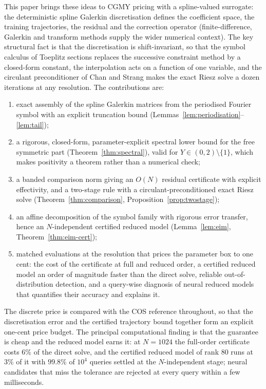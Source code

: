 \documentclass[hidelinks]{siamart251216}
\begin{document}
This paper brings these ideas to CGMY pricing with a spline-valued surrogate: the deterministic
spline Galerkin discretisation \cite{DamircheliCGMY2026} defines the coefficient space, the training
trajectories, the residual and the correction operator (finite-difference, Galerkin and transform
methods \cite{ContVoltchkova2005,MatacheVonPetersdorffSchwab2004,HilberReichmannSchwabWinter2013,FangOosterlee2008}
supply the wider numerical context).  The key structural fact is that the discretisation is
shift-invariant, so that the symbol calculus of Toeplitz sections
\cite{GrenanderSzego1958,BottcherSilbermann1999} replaces the successive constraint method by a
closed-form constant, the interpolation acts on a function of one variable, and the circulant
preconditioner of Chan and Strang \cite{ChanStrang1989} makes the exact Riesz solve a dozen
iterations at any resolution.  The contributions are:
\begin{enumerate}[leftmargin=2em]
\item exact assembly of the spline Galerkin matrices from the periodised
Fourier symbol with an explicit truncation bound (Lemmas~\ref{lem:periodisation}--\ref{lem:tail});
\item a rigorous, closed-form, parameter-explicit spectral lower bound for the free symmetric part
(Theorem~\ref{thm:spectral}), valid for $Y\in(0,2)\setminus\{1\}$, which makes positivity a
theorem rather than a numerical check;
\item a banded comparison norm giving an $O(N)$ residual certificate with explicit effectivity,
and a two-stage rule with a circulant-preconditioned exact Riesz solve
(Theorem~\ref{thm:comparison}, Proposition~\ref{prop:twostage});
\item an affine decomposition of the symbol family with rigorous error transfer, hence an
$N$-independent certified reduced model (Lemma~\ref{lem:eim}, Theorem~\ref{thm:eim-cert});
\item matched evaluations at the resolution that prices the parameter box to one cent: the cost
of the certificate at full and reduced order, a certified reduced model an order of magnitude
faster than the direct solve, reliable out-of-distribution detection, and a query-wise diagnosis
of neural reduced models that quantifies their accuracy and explains it.
\end{enumerate}
The discrete price is compared with the COS reference \cite{FangOosterlee2008} throughout, so that
the discretisation error and the certified trajectory bound together form an explicit one-cent
price budget.  The principal computational finding is that the guarantee is cheap and the reduced
model earns it: at $N=1024$ the full-order certificate costs $6\%$ of the direct solve, and the
certified reduced model of rank $80$ runs at $3\%$ of it with $99.8\%$ of $10^4$ queries settled at
the $N$-independent stage; neural candidates that miss the tolerance are rejected at every query
within a few milliseconds.
\end{document}

